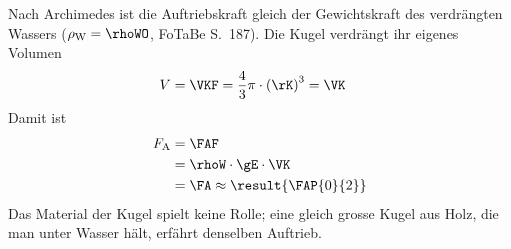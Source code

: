 Nach Archimedes ist die Auftriebskraft gleich der Gewichtskraft des verdrängten Wassers ($\rho_\text{W} = \rhoWO$, FoTaBe S.~187). Die Kugel verdrängt ihr eigenes Volumen
\begin{align}
 V &= \VKF = \frac{4}{3}\pi\cdot\left(\rK\right)^3 = \VK
\end{align}
Damit ist
\begin{align}
 F_\text{A} &= \FAF \\
   &= \rhoW\cdot\gE\cdot\VK \\
   &= \FA \approx \result{\FAP{0}{2}}
\end{align}
Das Material der Kugel spielt keine Rolle; eine gleich grosse Kugel aus Holz, die man unter Wasser hält, erfährt denselben Auftrieb.
